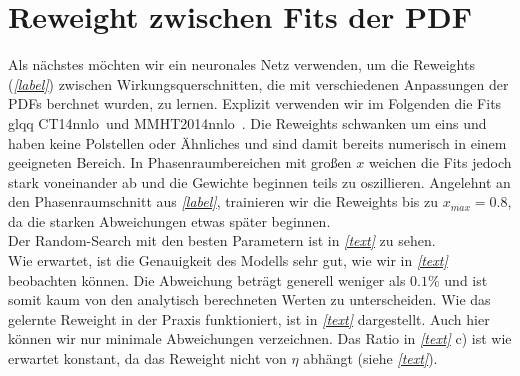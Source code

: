 \section{Reweight zwischen Fits der PDF}
Als nächstes möchten wir ein neuronales Netz verwenden, um die Reweights (\textit{\autoref{label}}) zwischen Wirkungsquerschnitten, die mit verschiedenen Anpassungen der PDFs berchnet wurden, zu lernen. Explizit verwenden wir im Folgenden die Fits glqq CT14nnlo\grqq~und \glqq MMHT2014nnlo\grqq~. Die Reweights schwanken um eins und haben keine Polstellen oder Ähnliches und sind damit bereits numerisch in einem geeigneten Bereich. In Phasenraumbereichen mit großen $x$ weichen die Fits jedoch stark voneinander ab und die Gewichte beginnen teils zu oszillieren. Angelehnt an den Phasenraumschnitt aus \textit{\autoref{label}}, trainieren wir die Reweights bis zu $x_{max} = 0.8$, da die starken Abweichungen etwas später beginnen. 
\\
Der Random-Search mit den besten Parametern ist in \textit{\autoref{text}} zu sehen.
\\
Wie erwartet, ist die Genauigkeit des Modells sehr gut, wie wir in \textit{\autoref{text}} beobachten können. Die Abweichung beträgt generell weniger als $0.1\%$ und ist somit kaum von den analytisch berechneten Werten zu unterscheiden. Wie das gelernte Reweight in der Praxis funktioniert, ist in \textit{\autoref{text}} dargestellt. Auch hier können wir nur minimale Abweichungen verzeichnen. Das Ratio in \textit{\autoref{text}} c) ist wie erwartet konstant, da das Reweight nicht von $\eta$ abhängt (siehe \textit{\autoref{text}}). 
